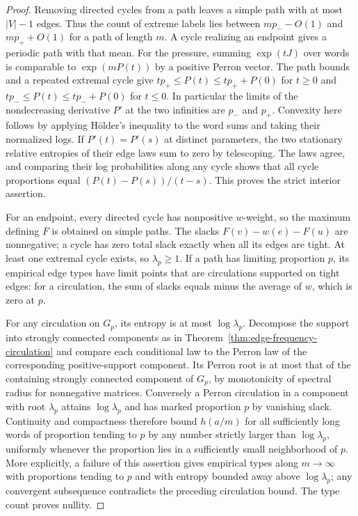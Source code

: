 \documentclass[11pt]{article}
\theoremstyle{definition}
\theoremstyle{remark}
\begin{document}
\begin{proof}
Removing directed cycles from a path leaves a simple path with at
most $|V|-1$ edges. Thus the count of extreme labels lies between
$mp_- - O(1)$ and $mp_++O(1)$ for a path of length $m$.
A cycle realizing an endpoint gives a periodic path with that
mean. For the pressure, summing $\exp(tJ)$ over words is
comparable to $\exp(mP(t))$ by a positive Perron vector.
The path bounds and a repeated extremal cycle give
$tp_+\le P(t)\le tp_++P(0)$ for $t\ge0$ and
$tp_-\le P(t)\le tp_-+P(0)$ for $t\le0$. In particular the
limits of the nondecreasing derivative $P'$ at the two
infinities are $p_-$ and $p_+$. Convexity here follows by
applying H\"older's inequality to the word sums and taking
their normalized logs. If $P'(t)=P'(s)$ at distinct parameters,
the two stationary relative entropies of their edge laws
sum to zero by telescoping. The laws agree, and comparing
their log probabilities along any cycle shows that all cycle
proportions equal $(P(t)-P(s))/(t-s)$. This proves the strict
interior assertion.

For an endpoint, every directed cycle has nonpositive $w$-weight,
so the maximum defining $F$ is obtained on simple paths.
The slacks $F(v)-w(e)-F(u)$ are nonnegative; a cycle has zero
total slack exactly when all its edges are tight. At least one
extremal cycle exists, so $\lambda_p\ge1$. If a path has limiting
proportion $p$, its empirical edge types have limit points that
are circulations supported on tight edges: for a circulation,
the sum of slacks equals minus the average of $w$, which is
zero at $p$.

For any circulation on $G_p$, its entropy is at most
$\log\lambda_p$. Decompose the support into strongly
connected components as in Theorem~\ref{thm:edge-frequency-circulation}
and compare each conditional law to the Perron law of the
corresponding positive-support component. Its Perron root is
at most that of the containing strongly connected component of
$G_p$, by monotonicity of spectral radius for nonnegative matrices. Conversely a Perron circulation in a component
with root $\lambda_p$ attains $\log\lambda_p$ and has marked
proportion $p$ by vanishing slack. Continuity and compactness
therefore bound $h(a/m)$ for all sufficiently long words
of proportion tending to $p$ by any number strictly larger
than $\log\lambda_p$, uniformly whenever the proportion lies
in a sufficiently small neighborhood of $p$. More explicitly,
a failure of this assertion gives empirical types along
$m\to\infty$ with proportions tending to $p$ and with entropy
bounded away above $\log\lambda_p$; any convergent subsequence
contradicts the preceding circulation bound. The type count
proves nullity.


\end{proof}
\end{document}
